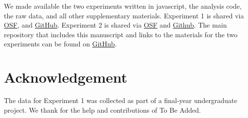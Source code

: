 \documentclass[10pt,letterpaper]{article}
\begin{document}
We made available the two experiments written in javascript, the analysis code, the raw data, and all other supplementary materials.
Experiment 1 is shared via \href{https://osf.io/auwvt/?view_only=2dc8384074fa4bcf9f2e3937fdaee2b4}{OSF}, and \href{TBA}{GitHub}.
Experiment 2 is shared via \href{https://osf.io/2tmc4/?view_only=489ebc888ef84a6b9b904072cfbe74df}{OSF} and \href{TBA}{Github}.
The main repository that includes this manuscript and links to the materials for the two experiments can be found on \href{TBA}{GitHub}.

\section{Acknowledgement}

The data for Experiment 1 was collected as part of a final-year undergraduate project. We thank for the help and contributions of To Be Added.



\setlength{\bibleftmargin}{.125in}
\setlength{\bibindent}{-\bibleftmargin}


\end{document}
